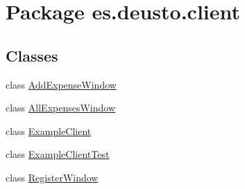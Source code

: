 \hypertarget{namespacees_1_1deusto_1_1client}{}\section{Package es.\+deusto.\+client}
\label{namespacees_1_1deusto_1_1client}
\subsection*{Classes}
\begin{DoxyCompactItemize}
\item 
class \hyperlink{classes_1_1deusto_1_1client_1_1_add_expense_window}{Add\+Expense\+Window}
\item 
class \hyperlink{classes_1_1deusto_1_1client_1_1_all_expenses_window}{All\+Expenses\+Window}
\item 
class \hyperlink{classes_1_1deusto_1_1client_1_1_example_client}{Example\+Client}
\item 
class \hyperlink{classes_1_1deusto_1_1client_1_1_example_client_test}{Example\+Client\+Test}
\item 
class \hyperlink{classes_1_1deusto_1_1client_1_1_register_window}{Register\+Window}
\end{DoxyCompactItemize}
